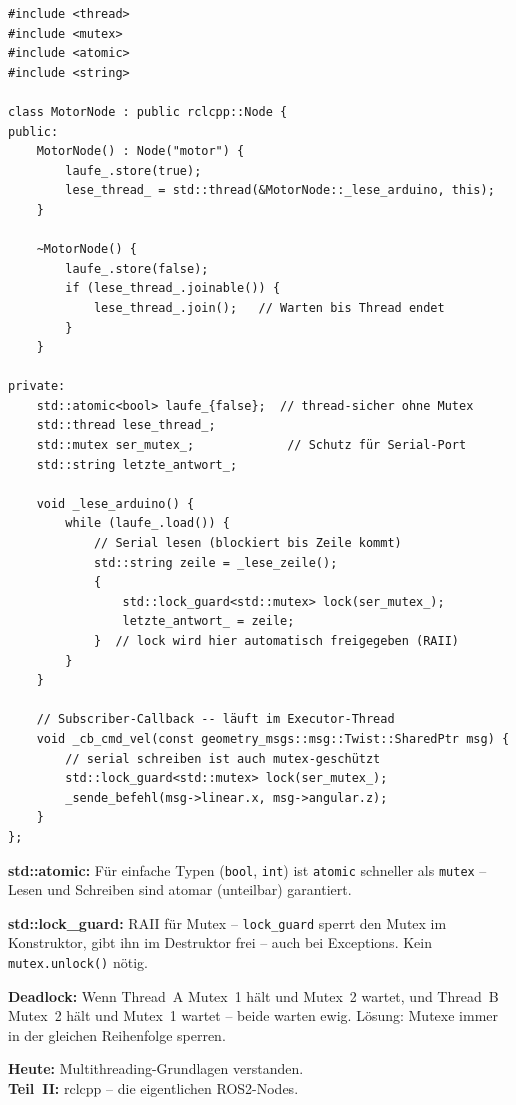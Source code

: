 \begin{lstlisting}[style=cpp]
#include <thread>
#include <mutex>
#include <atomic>
#include <string>

class MotorNode : public rclcpp::Node {
public:
    MotorNode() : Node("motor") {
        laufe_.store(true);
        lese_thread_ = std::thread(&MotorNode::_lese_arduino, this);
    }

    ~MotorNode() {
        laufe_.store(false);
        if (lese_thread_.joinable()) {
            lese_thread_.join();   // Warten bis Thread endet
        }
    }

private:
    std::atomic<bool> laufe_{false};  // thread-sicher ohne Mutex
    std::thread lese_thread_;
    std::mutex ser_mutex_;             // Schutz für Serial-Port
    std::string letzte_antwort_;

    void _lese_arduino() {
        while (laufe_.load()) {
            // Serial lesen (blockiert bis Zeile kommt)
            std::string zeile = _lese_zeile();
            {
                std::lock_guard<std::mutex> lock(ser_mutex_);
                letzte_antwort_ = zeile;
            }  // lock wird hier automatisch freigegeben (RAII)
        }
    }

    // Subscriber-Callback -- läuft im Executor-Thread
    void _cb_cmd_vel(const geometry_msgs::msg::Twist::SharedPtr msg) {
        // serial schreiben ist auch mutex-geschützt
        std::lock_guard<std::mutex> lock(ser_mutex_);
        _sende_befehl(msg->linear.x, msg->angular.z);
    }
};
\end{lstlisting}

\begin{wissenBox}
\textbf{std::atomic:} Für einfache Typen (\texttt{bool}, \texttt{int})
ist \texttt{atomic} schneller als \texttt{mutex} --
Lesen und Schreiben sind atomar (unteilbar) garantiert.

\textbf{std::lock\_guard:} RAII für Mutex --
\texttt{lock\_guard} sperrt den Mutex im Konstruktor,
gibt ihn im Destruktor frei -- auch bei Exceptions.
Kein \texttt{mutex.unlock()} nötig.

\textbf{Deadlock:} Wenn Thread~A Mutex~1 hält und Mutex~2 wartet,
und Thread~B Mutex~2 hält und Mutex~1 wartet --
beide warten ewig. Lösung: Mutexe immer in der gleichen Reihenfolge sperren.
\end{wissenBox}

\begin{projektBox}
\textbf{Heute:} Multithreading-Grundlagen verstanden.\\
\textbf{Teil~II:} rclcpp -- die eigentlichen ROS2-Nodes.
\end{projektBox}

